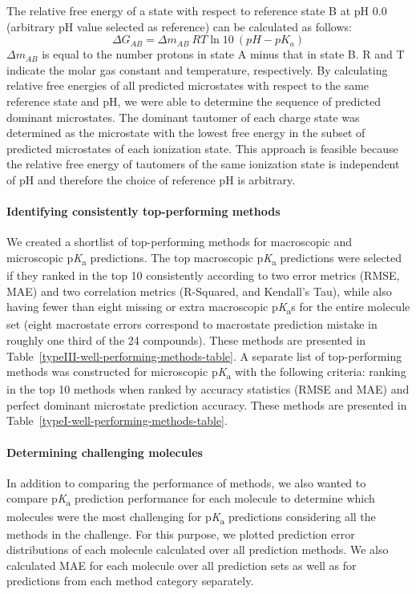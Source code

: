 \documentclass[9pt,lineno,final]{elife}
\newcommand{\pKa}{p\textit{K}\textsubscript{a}}
\begin{document}
The relative free energy of a state with respect to reference state B at pH 0.0 (arbitrary pH value selected as reference) can be calculated as follows: 
\begin{equation}
\Delta G_{AB} = \Delta m_{AB} \:RT\ln{10}\:(pH - pK_{a})
\label{eq:microstate_relative_free_energy}
\end{equation}
$\Delta m_{AB}$ is equal to the number protons in state A minus that in state B. R and T indicate the molar gas constant and temperature, respectively. 
By calculating relative free energies of all predicted microstates with respect to the same reference state and pH, we were able to determine the sequence of predicted dominant microstates. 
The dominant tautomer of each charge state was determined as the microstate with the lowest free energy in the subset of predicted microstates of each ionization state. 
This approach is feasible because the relative free energy of tautomers of the same ionization state is independent of pH and therefore the choice of reference pH is arbitrary.

\paragraph{Identifying consistently top-performing methods}

We created a shortlist of top-performing methods for macroscopic and microscopic \pKa{} predictions. 
The top macroscopic \pKa{} predictions were selected if they ranked in the top 10 consistently according to two error metrics (RMSE, MAE) and two correlation metrics (R-Squared, and Kendall’s Tau), while also having fewer than eight missing or extra macroscopic \pKa{}s for the entire molecule set (eight macrostate errors correspond to macrostate prediction mistake in roughly one third of the 24 compounds). 
These methods are presented in Table~\ref{typeIII-well-performing-methods-table}. A separate list of top-performing methods was constructed for microscopic \pKa{} with the following criteria: ranking in the top 10 methods when ranked by accuracy statistics (RMSE and MAE) and perfect dominant microstate prediction accuracy. 
These methods are presented in Table~\ref{typeI-well-performing-methods-table}.

\paragraph{Determining challenging molecules}

In addition to comparing the performance of methods, we also wanted to compare \pKa{} prediction performance for each molecule to determine which molecules were the most challenging for \pKa{} predictions considering all the methods in the challenge. 
For this purpose, we plotted prediction error distributions of each molecule calculated over all prediction methods. 
We also calculated MAE for each molecule over all prediction sets as well as for predictions from each method category separately. 
\end{document}
